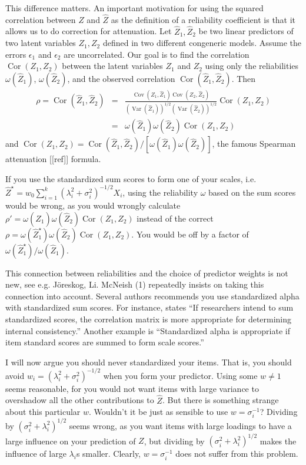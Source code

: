\documentclass{article}
\theoremstyle{plain}
\theoremstyle{plain}
\theoremstyle{definition}
\theoremstyle{remark}
\theoremstyle{definition}
\theoremstyle{plain}
\theoremstyle{plain}
\theoremstyle{definition}
\DeclareMathOperator{\Var}{Var}
\DeclareMathOperator{\Cor}{Cor}
\DeclareMathOperator{\Cov}{Cov}
\renewcommand{\sqrt}[1]{{(#1)^{1/2}}}
\begin{document}
This difference matters. An important motivation for using the squared
correlation between $Z$ and $\hat{Z}$ as the definition of a
reliability coefficient is that it allows us to do correction for
attenuation. Let $\hat{Z}_{1},\hat{Z}_{2}$ be two linear
predictors of two latent variables $Z_{1},Z_{2}$ defined in two different
congeneric models. Assume the errors $\epsilon_{1}$ and $\epsilon_{2}$
are uncorrelated. Our goal is to find the correlation $\Cor(Z_{1},Z_{2})$
between the latent variables $Z_{1}$ and $Z_{2}$ using only the
reliabilities $\omega(\hat{Z}_{1})$, $\omega(\hat{Z}_{2})$,
and the observed correlation $\Cor(\hat{Z}_{1},\hat{Z}_{2})$.
Then
\begin{eqnarray*}
\rho=\Cor(\hat{Z}_{1},\hat{Z}_{2}) & = & \frac{\Cov(Z_{1},\hat{Z}_{1})\Cov(Z_{2},\hat{Z}_{2})}{\sqrt{\Var(\hat{Z}_{1})}\sqrt{\Var(\hat{Z}_{2})}}\Cor(Z_{1},Z_{2})\\
 & = & \omega(\hat{Z}_{1})\omega(\hat{Z}_{2})\Cor(Z_{1},Z_{2})
\end{eqnarray*}
and $\Cor(Z_{1},Z_{2})=\Cor(\hat{Z}_{1},\hat{Z}_{2})/\left[\omega(\hat{Z}_{1})\omega(\hat{Z}_{2})\right]$,
the famous Spearman attenuation {[}{[}ref{]}{]} formula.

If you use the standardized sum scores to form one of your scales,
i.e. $\hat{Z}^{\star}=w_{0}\sum_{i=1}^{k}(\lambda_{i}^{2}+\sigma_{i}^{2})^{-1/2}X_{i}$,
using the reliability $\omega$ based on the sum scores would be wrong,
as you would wrongly calculate $\rho'=\omega(\hat{Z}_{1})\omega(\hat{Z}_{2})\Cor(Z_{1},Z_{2})$
instead of the correct $\rho=\omega(\hat{Z}_{1}^{\star})\omega(\hat{Z}_{2})\Cor(Z_{1},Z_{2})$.
You would be off by a factor of $\omega(\hat{Z}_{1}^{\star})/\omega(\hat{Z}_{1})$.

This connection between reliabilities and the choice of predictor
weights is not new, see e.g. Jöreskog, Li. McNeish (1) repeatedly
insists on taking this connection into account. Several authors recommends you use standardized alpha with standardized sum scores. For instance, \citet[][p.451]{Falk2011-ae} states \enquote{If researchers intend to sum
standardized scores, the correlation matrix is more appropriate for determining internal consistency.} Another example is \citet[][p.99]{Cortina1993-aq} \enquote{Standardized alpha is appropriate if item standard scores are summed to form scale scores.}

I will now argue you should never standardized your items. That is, you should avoid $w_{i}=(\lambda_{i}^{2}+\sigma_{i}^{2})^{-1/2}$ when you form your predictor.
Using some $w\ne1$ seems reasonable, for you would not want items
with large variance to overshadow all the other contributions to $\hat{Z}$.
But there is something strange about this particular $w$. Wouldn't
it be just as sensible to use $w=\sigma_{i}^{-1}$? Dividing by $(\sigma_{i}^{2}+\lambda_{i}^{2})^{1/2}$
seems wrong, as you want items with large loadings to have a large
influence on your prediction of $Z$, but dividing by $(\sigma_{i}^{2}+\lambda_{i}^{2})^{1/2}$
makes the influence of large $\lambda_{i}$s smaller. Clearly, $w=\sigma_{i}^{-1}$
does not suffer from this problem. 
\end{document}
